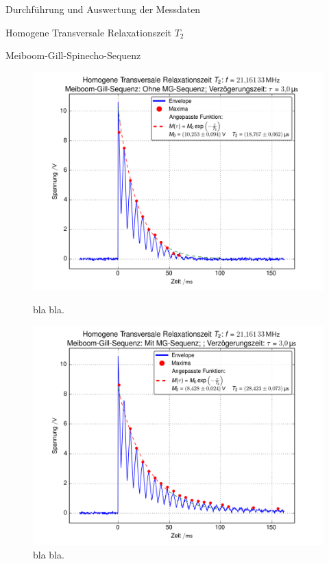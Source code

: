 \documentclass[pdftex, a4paper,11pt, twoside, ngerman]{report}
\begin{document}
\begin{chapter}{Durchführung und Auswertung der Messdaten}
\begin{section}{
        Homogene Transversale Relaxationszeit $T_{2}$}
\begin{subsection}{Meiboom-Gill-Spinecho-Sequenz}
\begin{figure}[htb]
          \begin{minipage}{.48\textwidth}
            \centering
            \includegraphics[width=\textwidth]
            {Figures/HomoTransRelax_MG_env2.png}
            \caption{bla bla.}
            \label{figMG_env2}
          \end{minipage}\quad
          \begin{minipage}{.48\textwidth}
            \centering
            \includegraphics[width=\textwidth]
            {Figures/HomoTransRelax_MG_env3.png}
            \caption{bla bla.}
            \label{figMG_env3}
          \end{minipage}
        \end{figure}
        

\end{subsection}
\end{section}
\end{chapter}
\end{document}
